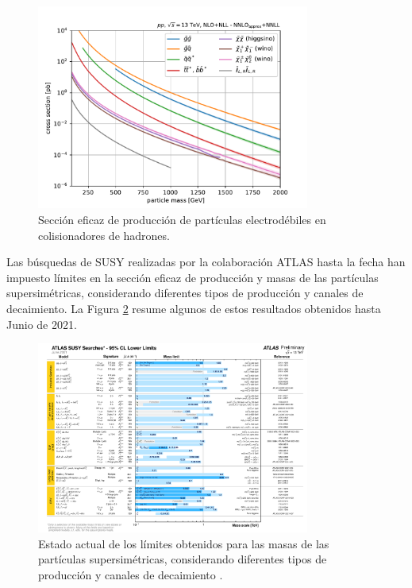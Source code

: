 \begin{figure}
  \centering
  \includegraphics[width=0.8\textwidth]{images/theory/SUSY_xsecs_13TeV_overview.pdf}
  \caption{Sección eficaz de producción de partículas electrodébiles en colisionadores de hadrones\cite{susy_xs}.}
  \label{fig:susy_xs}
\end{figure}


Las búsquedas de SUSY realizadas por la colaboración ATLAS hasta la fecha han impuesto límites en la sección eficaz de producción y masas de las partículas supersimétricas, considerando diferentes tipos de producción y canales de decaimiento. La Figura \ref{fig:susy_xs_limits} resume algunos de estos resultados obtenidos hasta Junio de 2021.


\begin{figure}
	\centering
  \includegraphics[width=0.8\textwidth]{images/theory/susy_xs_limits.pdf}
  \caption{Estado actual de los límites obtenidos para las masas de las partículas supersimétricas, considerando diferentes tipos de producción y canales de decaimiento \cite{susy_xs_limits}.}
  \label{fig:susy_xs_limits}
\end{figure}